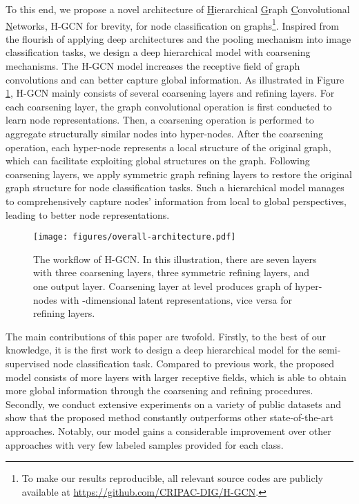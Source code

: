 \documentclass{article}
\begin{document}
To this end, we propose a novel architecture of \underline{H}ierarchical \underline{G}raph \underline{C}onvolutional \underline{N}etworks, H-GCN for brevity, for node classification on graphs\footnote{To make our results reproducible, all relevant source codes are publicly available at \url{https://github.com/CRIPAC-DIG/H-GCN}.}. Inspired from the flourish of applying deep architectures and the pooling mechanism into image classification tasks, we design a deep hierarchical model with coarsening mechanisms. The H-GCN model increases the receptive field of graph convolutions and can better capture global information. As illustrated in Figure \ref{fig:workflow}, H-GCN mainly consists of several coarsening layers and refining layers. For each coarsening layer, the graph convolutional operation is first conducted to learn node representations. Then, a coarsening operation is performed to aggregate structurally similar nodes into hyper-nodes. After the coarsening operation, each hyper-node represents a local structure of the original graph, which can facilitate exploiting global structures on the graph. Following coarsening layers, we apply symmetric graph refining layers to restore the original graph structure for node classification tasks. Such a hierarchical model manages to comprehensively capture nodes' information from local to global perspectives, leading to better node representations.

\begin{figure}
	\centering
	\texttt{[image: figures/overall-architecture.pdf]}
	\caption{The workflow of H-GCN. In this illustration, there are seven layers with three coarsening layers, three symmetric refining layers, and one output layer. Coarsening layer at level  produces graph  of  hyper-nodes with -dimensional latent representations, vice versa for refining layers.}
	\label{fig:workflow}
\end{figure}

The main contributions of this paper are twofold. Firstly, to the best of our knowledge, it is the first work to design a deep hierarchical model for the semi-supervised node classification task. Compared to previous work, the proposed model consists of more layers with larger receptive fields, which is able to obtain more global information through the coarsening and refining procedures. Secondly, we conduct extensive experiments on a variety of public datasets and show that the proposed method constantly outperforms other state-of-the-art approaches. Notably, our model gains a considerable improvement over other approaches with very few labeled samples provided for each class.
\end{document}
